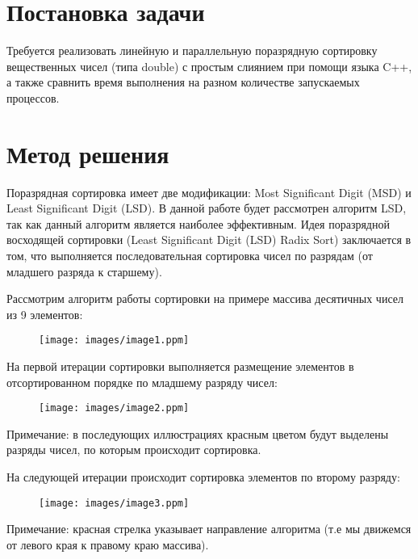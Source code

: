 \documentclass{report}
\begin{document}
\setcounter{page}{2}

\tableofcontents
\newpage

\section*{Постановка задачи}
Требуется реализовать линейную и параллельную поразрядную сортировку вещественных чисел (типа double) с простым слиянием при помощи языка C++, а также сравнить время выполнения на разном количестве запускаемых процессов.
\newpage

\section*{Метод решения}
Поразрядная сортировка имеет две модификации: Most Significant Digit (MSD) и Least Significant Digit (LSD). В данной работе будет рассмотрен алгоритм LSD, так как данный алгоритм является наиболее эффективным. Идея поразрядной восходящей сортировки (Least Significant Digit (LSD) Radix Sort) заключается в том, что выполняется последовательная сортировка чисел по разрядам (от младшего разряда к старшему). 

Рассмотрим алгоритм работы сортировки на примере массива десятичных чисел из 9 элементов:

\begin{figure}[htp]
    \centering
    \texttt{[image: images/image1.ppm]}
    \label{fig:galaxy}
\end{figure}

На первой итерации сортировки выполняется размещение элементов в отсортированном порядке по младшему разряду чисел:

\begin{figure}[htp]
    \centering
    \texttt{[image: images/image2.ppm]}
    \label{fig:galaxy}
\end{figure}

Примечание: в последующих иллюстрациях красным цветом будут выделены разряды чисел, по которым происходит сортировка.


На следующей итерации происходит сортировка элементов по второму разряду:

\begin{figure}[htp]
    \centering
    \texttt{[image: images/image3.ppm]}
    \label{fig:galaxy}
\end{figure}
\newpage
Примечание: красная стрелка указывает направление алгоритма (т.е мы движемся от левого края к правому краю массива).
\end{document}
